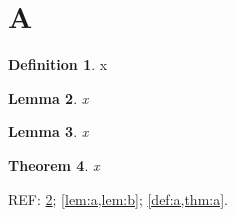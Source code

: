 \documentclass{article}
\theoremstyle{definition}\newtheorem{definition}{Definition}[section]
\theoremstyle{plain}\newtheorem{theorem}[definition]{Theorem}\newtheorem{lemma}[definition]{Lemma}
\begin{document}
\section{A}
\begin{definition}\label{def:a}x\end{definition}
\begin{lemma}\label{lem:a}x\end{lemma}
\begin{lemma}\label{lem:b}x\end{lemma}
\begin{theorem}\label{thm:a}x\end{theorem}
REF: \cref{lem:a}; \cref{lem:a,lem:b}; \cref{def:a,thm:a}.
\end{document}
